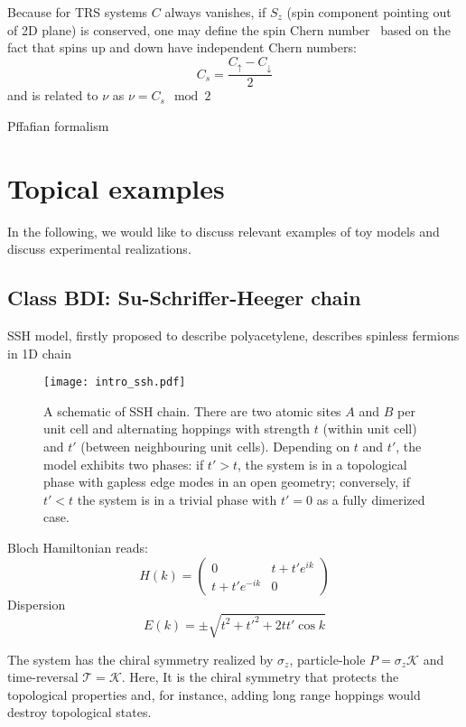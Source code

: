 {Because for TRS systems $C$ always vanishes, if $S_z$ (spin component pointing out of 2D plane) is conserved, one may define the spin Chern number~\cite{ShengCs2006} based on the fact that spins up and down have independent Chern numbers:
\begin{equation}
C_s = \frac{C_{\uparrow} - C_{\downarrow}}{2}
\label{eq:spinchern}
\end{equation}
and is related to $\nu$ as $\nu = C_s \mod 2$



Pffafian formalism 

\section{Topical examples}
In the following, we would like to discuss relevant examples of toy models and discuss experimental realizations.

\subsection{Class BDI: Su-Schriffer-Heeger chain}
SSH model, firstly proposed to describe polyacetylene, describes spinless fermions in 1D chain~\cite{SSH1976}

\begin{figure}[H]
\centering
\texttt{[image: intro\_ssh.pdf]}
\caption{A schematic of SSH chain. There are two atomic sites $A$ and $B$ per unit cell and alternating hoppings with strength $t$ (within unit cell) and $t'$ (between neighbouring unit cells). Depending on $t$ and $t'$,  the model exhibits two phases: if $t' > t$, the system is in a topological phase with gapless edge modes in an open geometry; conversely, if $t' < t$ the system is in a trivial phase with $t' = 0$ as a fully dimerized case.}
\label{fig:ssh}
\end{figure}

Bloch Hamiltonian reads:
\begin{equation}
H (k) = \begin{pmatrix}
0 & t + t' e^{i k} \\
t + t' e^{-i k} & 0
\end{pmatrix}
\label{eq:ssh}
\end{equation}
Dispersion
\begin{equation}
E(k) = \pm \sqrt{t^2 + t'^2 + 2 t t' \cos k}
\end{equation}



The system has the chiral symmetry realized by $\sigma_z$, particle-hole $P = \sigma_z \mathcal{K}$ and time-reversal $\mathcal{T} = \mathcal{K}$. Here, It is the chiral symmetry that protects the topological properties and, for instance, adding long range hoppings would destroy topological states.


}
